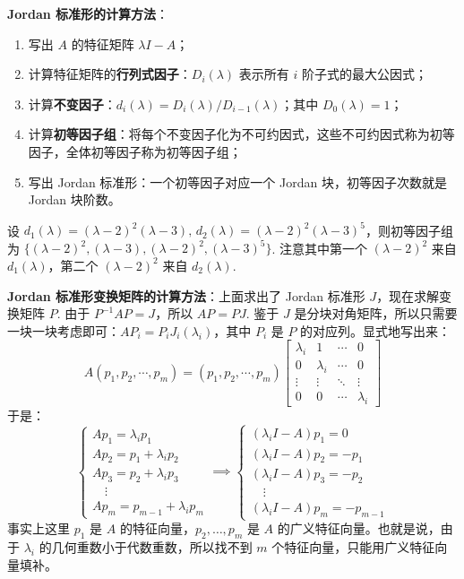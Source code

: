 \vskip 6pt \noindent\textbf{Jordan 标准形的计算方法}：

\begin{enumerate}
    \item 写出 $A$ 的特征矩阵 $\lambda I-A$；
    \item 计算特征矩阵的\textbf{行列式因子}：$D_i(\lambda)$ 表示所有 $i$ 阶子式的最大公因式；
    \item 计算\textbf{不变因子}：$d_i(\lambda)=D_i(\lambda)/D_{i-1}(\lambda)$；其中 $D_0(\lambda)=1$；
    \item 计算\textbf{初等因子组}：将每个不变因子化为不可约因式，这些不可约因式称为初等因子，全体初等因子称为初等因子组；
    \item 写出 Jordan 标准形：一个初等因子对应一个 Jordan 块，初等因子次数就是 Jordan 块阶数。
\end{enumerate}

\begin{example}
设 $d_1(\lambda)=(\lambda-2)^2(\lambda-3),\,d_2(\lambda)=(\lambda-2)^2(\lambda-3)^5$，则初等因子组为 $\{(\lambda-2)^2,(\lambda-3),(\lambda-2)^2,(\lambda-3)^5\}$.  注意其中第一个 $(\lambda-2)^2$ 来自 $d_1(\lambda)$，第二个 $(\lambda-2)^2$ 来自 $d_2(\lambda)$.
\end{example}

\noindent\textbf{Jordan 标准形变换矩阵的计算方法}：上面求出了 Jordan 标准形 $J$，现在求解变换矩阵 $P$.
由于 $P^{-1}AP=J$，所以 $AP=PJ$.  鉴于 $J$ 是分块对角矩阵，所以只需要一块一块考虑即可：$AP_i=P_iJ_i(\lambda_i)$，其中 $P_i$ 是 $P$ 的对应列。显式地写出来：
\[
    A(p_1,p_2,\cdots,p_m)=(p_1,p_2,\cdots,p_m)
    \begin{bmatrix}
    \lambda_i&1&\cdots&0\\
    0&\lambda_i&\cdots&0\\
    \vdots&\vdots&\ddots&\vdots\\
    0&0&\cdots&\lambda_i
    \end{bmatrix}
\]
于是：
\[
    \begin{cases}
    Ap_1=\lambda_ip_1\\
    Ap_2=p_1+\lambda_ip_2\\
    Ap_3=p_2+\lambda_ip_3\\
    \quad\vdots\\
    Ap_m=p_{m-1}+\lambda_ip_m
    \end{cases}\implies
    \begin{cases}
    (\lambda_iI-A)p_1=0\\
    (\lambda_iI-A)p_2=-p_1\\
    (\lambda_iI-A)p_3=-p_2\\
    \quad\vdots\\
    (\lambda_iI-A)p_m=-p_{m-1}
    \end{cases}
\]
事实上这里 $p_1$ 是 $A$ 的特征向量，$p_2,\ldots,p_m$ 是 $A$ 的广义特征向量。也就是说，由于 $\lambda_i$ 的几何重数小于代数重数，所以找不到 $m$ 个特征向量，只能用广义特征向量填补。

